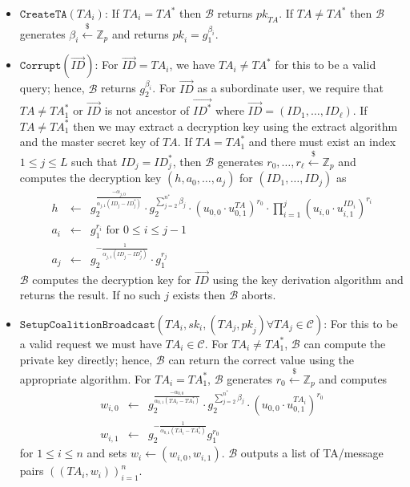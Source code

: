 \documentclass[10pt]{llncs}
\newcommand{\B}{\mathcal{B}}
\newcommand{\C}{\mathcal{C}}
\newcommand{\Zbb}{\mathbb{Z}}
\newcommand{\ID}{\mathit{ID}}
\newcommand{\TA}{\mathit{TA}}
\newcommand{\pk}{\mathit{pk}}
\newcommand{\sk}{\mathit{sk}}
\newcommand{\getsr}{\stackrel{{\scriptscriptstyle\$}}{\gets}}
\begin{document}
\begin{enumerate}
\begin{itemize}
	\item $\texttt{CreateTA}(\TA_i)$: If $\TA_i = \TA^{*}$ then $\B$ returns $\pk_{\TA}$. If $\TA \neq \TA^{*}$ then $\B$ generates $\beta_i \getsr \Zbb_{p}$ and returns $\pk_i = g_{1}^{\beta_i}$.
	\item $\texttt{Corrupt}(\vec{\ID})$: For $\vec{\ID} = \TA_i$, we have $\TA_i \neq \TA^{*}$ for this to be a valid query; hence, $\B$ returns $g_{2}^{\beta_i}$. For $\vec{\ID}$ as a subordinate user, we require that $\TA\neq \TA^{*}_{1}$ or $\vec{\ID}$ is not ancestor of $\vec{\ID^{*}}$ where $\vec{\ID}=(\ID_{1},\ldots,\ID_{\ell})$. If $\TA\neq \TA^{*}_{1}$ then we may extract a decryption key using the extract algorithm and the master secret key of $\TA$. If $\TA=\TA^{*}_{1}$ and there must exist an index $1\leq j\leq L$ such that $\ID_{j} = \ID^{*}_{j}$, then $\B$ generates $r_{0},\ldots,r_{\ell}\getsr \Zbb_{p}$ and computes the decryption key $(h,a_{0},\ldots,a_{j})$ for $(\ID_{1},\ldots,\ID_{j})$ as
		\begin{eqnarray*}
		h &\gets& g_{2}^{\frac{-\alpha_{j,0}}{\alpha_{j,1}(\ID_{j}-\ID^{*}_{j})}} \cdot g_{2}^{\sum_{j=2}^{n^{*}}\beta_{j}}\cdot \left(u_{0,0}\cdot u_{0,1}^{\TA}\right)^{r_{0}} \cdot \prod_{i=1}^{j} \left(u_{i,0}\cdot u_{i,1}^{\ID_{i}}\right)^{r_{i}}\\
		a_{i} &\gets& g_{1}^{r_{i}} \mbox{ for } 0\leq i\leq j-1\\
		a_{j} &\gets& g_{2}^{-\frac{1}{\alpha_{j,1}(\ID_{j}-\ID^{*}_{j})}} \cdot g_{1}^{r_{j}}
		\end{eqnarray*}
		$\B$ computes the decryption key for $\vec{\ID}$ using the key derivation algorithm and returns the result. If no such $j$ exists then $\B$ aborts.

	\item $\texttt{SetupCoalitionBroadcast}(\TA_i, \sk_i,(\TA_j, \pk_j) \forall \TA_j \in \C)$: For this to be a valid request we must have $\TA_i \in \C$. For $\TA_i \neq \TA^{*}_{1}$, $\B$ can compute the private key directly; hence, $\B$ can return the correct value using the appropriate algorithm. For $\TA_i=\TA^{*}_{1}$, $\B$ generates $r_{0}\getsr \Zbb_{p}$ and computes
		\begin{eqnarray*}
		w_{i,0} &\gets& g_{2}^{\frac{-\alpha_{0,0}}{\alpha_{0,1}(\TA_{i}-\TA^{*}_{1})}} \cdot g_{2}^{\sum_{j=2}^{n^{*}}\beta_{j}} \cdot \left( u_{0,0} \cdot u_{0,1}^{\TA_{i}} \right)^{r_{0}}\\
		w_{i,1} &\gets& g_{2}^{-\frac{1}{\alpha_{0,1}(\TA_{i}-\TA^{*}_{1})}}g_{1}^{r_{0}}
		\end{eqnarray*}
		for $1\leq i\leq n$ and sets $w_{i}\gets (w_{i,0},w_{i,1})$. $\B$ outputs a list of TA/message pairs $((\TA_{i},w_{i}))_{i=1}^{n}$.
		

\end{itemize}
\end{enumerate}
\end{document}
